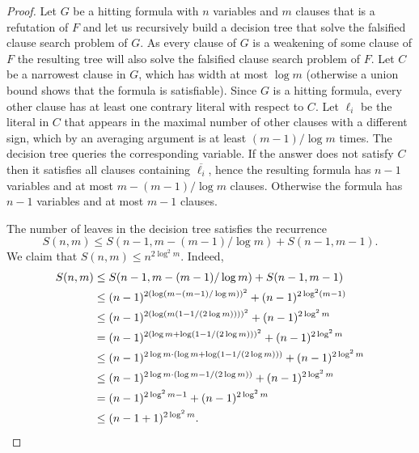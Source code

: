 \documentclass[11pt]{article}
\newcommand{\olnot}[1]{\overline{#1}}
\numberwithin{equation}{section}
\begin{document}
\begin{proof}
  Let $G$ be a hitting formula with $n$ variables and $m$ clauses that is a refutation of $F$ and let us recursively build a decision tree that solve the falsified clause search problem of $G$. As every clause of $G$ is a weakening of some clause of $F$ the resulting tree will also solve the falsified clause search problem of $F$.
  Let $C$ be a narrowest clause in $G$, which has width at most $\log m$ (otherwise a union bound shows that the formula is satisfiable). Since $G$ is a hitting formula, every other clause has at least one contrary literal with respect to $C$. Let $\ell_i$ be the literal in $C$ that appears in the maximal number of other clauses with a different sign, which by an averaging argument is at least $(m-1)/\log m$ times. The decision tree queries the corresponding variable. If the answer does not satisfy $C$ then it satisfies all clauses containing $\olnot{\ell_i}$, hence the resulting formula has $n-1$ variables and at most $m - (m-1)/\log m$ clauses. Otherwise the formula has $n-1$ variables and at most $m-1$ clauses.

  The number of leaves in the decision tree satisfies the recurrence 
  \[
    S(n,m) \leq S(n-1,m - (m-1)/\log m) + S(n-1,m-1).
  \] 
  We claim that $S(n,m) \leq n^{2\log^2 m}$. Indeed,
  \begin{align*}
    S(n,m)
    &\leq S(n-1,m - (m-1)/\log m) + S(n-1,m-1) \\
    &\leq (n-1)^{2(\log(m - (m-1)/\log m))^2} + (n-1)^{2\log^2 (m-1)} \\
    &\leq (n-1)^{2(\log(m(1- 1/(2\log m))))^2} + (n-1)^{2\log^2 m} \\
    &= (n-1)^{2(\log m+\log(1-1/(2\log m)))^2} + (n-1)^{2\log^2 m} \\
       &\leq (n-1)^{2\log m\cdot(\log m + \log(1-1/(2\log m)))} + (n-1)^{2\log^2 m} \\
    &\leq (n-1)^{2\log m\cdot(\log m - 1/(2\log m))} + (n-1)^{2\log^2 m} \\
       &= (n-1)^{2\log^2 m - 1} + (n-1)^{2\log^2 m} \\
    &\leq (n-1+1)^{2\log^2 m}. \qedhere
  \end{align*}
\end{proof}
\end{document}
